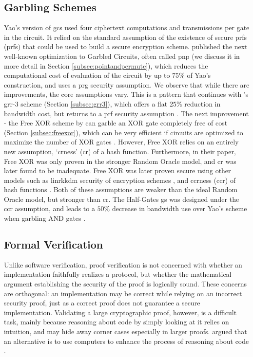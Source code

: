 \subsection{Garbling Schemes}
Yao's version of \acrlong{gc}s used four ciphertext computations and transmissions per gate in the circuit. It relied on the standard assumption of the existence of secure \acrlong{prf}s (\acrshort{prf}s) that could be used to build a secure encryption scheme. \citeauthor{STOC:BeaMicRog90} \cite{STOC:BeaMicRog90} published the next well-known optimization to Garbled Circuits, often called \acrfull{pnp} (we discuss it in more detail in Section \ref{subsec:pointandpermute}), which reduces the computational cost of evaluation of the circuit by up to $75\%$ of Yao's construction, and uses a \acrfull{prg} security assumption. We observe that while there are improvements, the core assumptions vary. This is a pattern that continues with \citeauthor{ACMCEC:NaPiSu99}'s \acrlong{grr}-3 scheme (Section \ref{subsec:grr3}), which offers a flat $25\%$ reduction in bandwidth cost, but returns to a \acrshort{prf} security assumption \cite{ACMCEC:NaPiSu99}. The next improvement - the Free XOR scheme by \citeauthor{ALP:KolSch08} can garble an XOR gate completely free of cost (Section \ref{subsec:freexor}), which can be very efficient if circuits are optimized to maximize the number of XOR gates \cite{ALP:KolSch08}. However, Free XOR relies on an entirely new assumption, `\acrlong{cr}ness' (\acrshort{cr}) of a hash function. Furthermore, in their paper, Free XOR was only proven in the stronger Random Oracle model, and \acrshort{cr} was later found to be inadequate. Free XOR was later proven secure using other models such as \acrfull{linrkkdm} security of encryption schemes \cite{JC:Applebaum16}, and \acrlong{ccr}ness (\acrshort{ccr}) of hash functions \cite{TCC:CKKZ12}. Both of these assumptions are weaker than the ideal Random Oracle model, but stronger than \acrshort{cr}. The Half-Gates \acrlong{gs} was designed under the \acrshort{ccr} assumption, and leads to a $50\%$ decrease in bandwidth use over Yao's scheme when garbling AND gates \cite{EC:ZahRosEva15}.

\subsection{Formal Verification}
Unlike software verification, proof verification is not concerned with whether an implementation faithfully realizes a protocol, but whether the mathematical argument establishing the security of the proof is logically sound. These concerns are orthogonal: an implementation may be correct while relying on an incorrect security proof, just as a correct proof does not guarantee a secure implementation. Validating a large cryptographic proof, however, is a difficult task, mainly because reasoning about code by simply looking at it relies on intuition, and may hide away corner cases especially in larger proofs. \citeauthor{EPRINT:Halevi05b} argued that an alternative is to use computers to enhance the process of reasoning about code \cite{EPRINT:Halevi05b}. 


